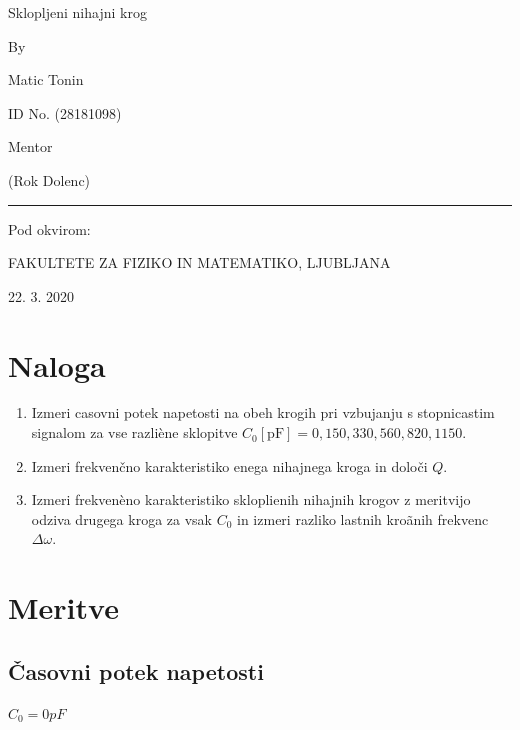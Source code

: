 \documentclass[11pt, a4paper]{article}
\theoremstyle{definition}
\theoremstyle{example}
\theoremstyle{izrek}
\begin{document}
\begin{center}
\thispagestyle{empty}
\parskip=14pt%
\vspace*{3\parskip}%
\begin{Huge} Sklopljeni nihajni krog \end{Huge}

By

Matic Tonin

ID No. (28181098)

Mentor 

(Rok Dolenc)

\rule{7cm}{0.4pt}

Pod okvirom:

FAKULTETE ZA FIZIKO IN MATEMATIKO, LJUBLJANA

22. 3. 2020

\end{center}
\pagebreak
\section{Naloga}
\begin{enumerate}
\item Izmeri casovni potek napetosti na obeh krogih pri vzbujanju s stopnicastim signalom za vse razliène sklopitve $C_{0}[\mathrm{pF}]=0,150,330,560,820,1150$.
\item Izmeri frekvenčno karakteristiko enega nihajnega kroga in določi $Q$.
\item Izmeri frekvenèno karakteristiko skloplienih nihajnih krogov z meritvijo odziva drugega kroga za vsak $C_{0}$ in izmeri razliko lastnih kroãnih frekvenc $\Delta \omega$.
\end{enumerate}
\section{Meritve}
\subsection{Časovni potek napetosti}
\textbf{\underline{$C_0=0 pF$}}\\
\end{document}
